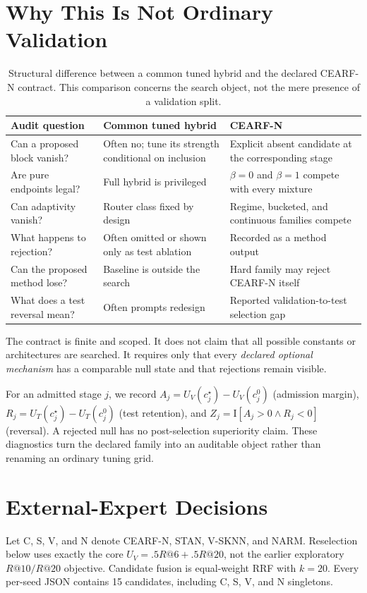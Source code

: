 \documentclass[runningheads]{llncs}
\newcommand{\method}{CEARF-N}
\begin{document}
\section{Why This Is Not Ordinary Validation}
\begin{table}[t]
\caption{Structural difference between a common tuned hybrid and the declared
\method{} contract. This comparison concerns the search object, not the mere
presence of a validation split.}
\centering
\begin{tabular}{>{\raggedright\arraybackslash}p{2.5cm}
                >{\raggedright\arraybackslash}p{4.2cm}
                >{\raggedright\arraybackslash}p{4.2cm}}
\toprule
Audit question & Common tuned hybrid & \method{}\\
\midrule
Can a proposed block vanish? & Often no; tune its strength conditional on
inclusion & Explicit absent candidate at the corresponding stage\\
Are pure endpoints legal? & Full hybrid is privileged & $\beta=0$ and
$\beta=1$ compete with every mixture\\
Can adaptivity vanish? & Router class fixed by design & Regime, bucketed, and
continuous families compete\\
What happens to rejection? & Often omitted or shown only as test ablation &
Recorded as a method output\\
Can the proposed method lose? & Baseline is outside the search & Hard family
may reject \method{} itself\\
What does a test reversal mean? & Often prompts redesign & Reported
validation-to-test selection gap\\
\bottomrule
\end{tabular}
\end{table}

The contract is finite and scoped. It does not claim that all possible
constants or architectures are searched. It requires only that every
\emph{declared optional mechanism} has a comparable null state and that
rejections remain visible.

For an admitted stage $j$, we record
$A_j=U_V(c_j^\star)-U_V(c_j^0)$ (admission margin),
$R_j=U_T(c_j^\star)-U_T(c_j^0)$ (test retention), and
$Z_j=\mathrm I[A_j>0\wedge R_j<0]$ (reversal). A rejected null has no
post-selection superiority claim. These diagnostics turn the declared family
into an auditable object rather than renaming an ordinary tuning grid.

\section{External-Expert Decisions}
Let C, S, V, and N denote \method{}, STAN, V-SKNN, and NARM. Reselection below
uses exactly the core $U_V=.5R@6+.5R@20$, not the earlier exploratory
$R@10/R@20$ objective. Candidate fusion is equal-weight RRF with $k=20$.
Every per-seed JSON contains 15 candidates, including C, S, V, and N
singletons.
\end{document}

